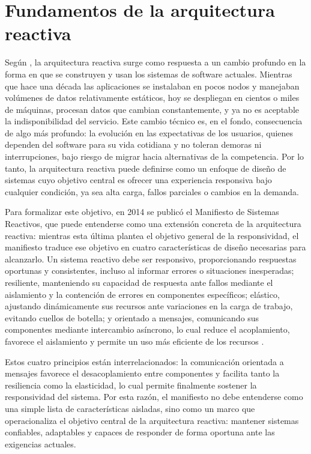 \documentclass[12pt, letterpaper]{article}
\begin{document}
\section*{Fundamentos de la arquitectura reactiva}
Según \parencite{guzel2021reactive}, la arquitectura reactiva surge como respuesta a un cambio profundo en la forma en que se construyen y usan los sistemas de software actuales. Mientras que hace una década las aplicaciones se instalaban en pocos nodos y manejaban volúmenes de datos relativamente estáticos, hoy se despliegan en cientos o miles de máquinas, procesan datos que cambian constantemente, y ya no es aceptable la indisponibilidad del servicio. Este cambio técnico es, en el fondo, consecuencia de algo más profundo: la evolución en las expectativas de los usuarios, quienes dependen del software para su vida cotidiana y no toleran demoras ni interrupciones, bajo riesgo de migrar hacia alternativas de la competencia. Por lo tanto, la arquitectura reactiva puede definirse como un enfoque de diseño de sistemas cuyo objetivo central es ofrecer una experiencia responsiva bajo cualquier condición, ya sea alta carga, fallos parciales o cambios en la demanda.

Para formalizar este objetivo, en 2014 se publicó el Manifiesto de Sistemas Reactivos, que puede entenderse como una extensión concreta de la arquitectura reactiva: mientras esta última plantea el objetivo general de la responsividad, el manifiesto traduce ese objetivo en cuatro características de diseño necesarias para alcanzarlo. Un sistema reactivo debe ser responsivo, proporcionando respuestas oportunas y consistentes, incluso al informar errores o situaciones inesperadas; resiliente, manteniendo su capacidad de respuesta ante fallos mediante el aislamiento y la contención de errores en componentes específicos; elástico, ajustando dinámicamente sus recursos ante variaciones en la carga de trabajo, evitando cuellos de botella; y orientado a mensajes, comunicando sus componentes mediante intercambio asíncrono, lo cual reduce el acoplamiento, favorece el aislamiento y permite un uso más eficiente de los recursos \parencite{boner2014reactive}.

Estos cuatro principios están interrelacionados: la comunicación orientada a mensajes favorece el desacoplamiento entre componentes y facilita tanto la resiliencia como la elasticidad, lo cual permite finalmente sostener la responsividad del sistema. Por esta razón, el manifiesto no debe entenderse como una simple lista de características aisladas, sino como un marco que operacionaliza el objetivo central de la arquitectura reactiva: mantener sistemas confiables, adaptables y capaces de responder de forma oportuna ante las exigencias actuales.
\end{document}
